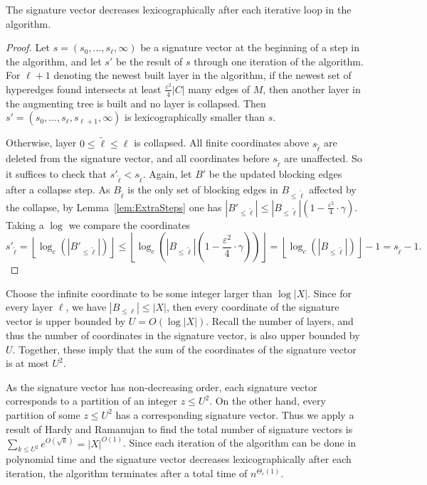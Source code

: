 \begin{lemma}\label{lem:LexOrderDecreases}
The signature vector decreases lexicographically after each iterative loop in the algorithm. 
\end{lemma}
\begin{proof}
Let $s = (s_0,\ldots,s_{\ell},\infty)$ be a signature vector at the beginning of a step in the algorithm, and let $s'$ be the result of $s$ through one iteration of the algorithm. For $\ell+1$ denoting the newest built layer in the algorithm, if the newest set of hyperedges found intersects at least $\frac{\varepsilon^2}{4}|C|$ many edges of $M$, then another layer in the augmenting tree is built and no layer is collapsed. Then $s' = (s_0,\ldots,s_{\ell},s_{\ell+1},\infty)$ is lexicographically smaller than $s$.

Otherwise, layer $0 \leq \tilde{\ell} \leq \ell$ is collapsed. All finite coordinates above $s_{\tilde{\ell}}$ are deleted from the signature vector, and all coordinates before $s_{\tilde{\ell}}$ are unaffected. So it suffices to check that $s'_{\tilde{\ell}} < s_{\tilde{\ell}}$. Again, let $B'$ be the updated blocking edges after a collapse step. As $B_{\tilde{\ell}}$ is the only set of blocking edges in $B_{\leq \tilde{\ell}}$ affected by the collapse, by Lemma~\ref{lem:ExtraSteps} one has $|B'_{\leq \tilde{\ell}}| \leq |B_{\leq \tilde{\ell}}|(1-\frac{\varepsilon^2}{4} \cdot \gamma )$. Taking a $\log$ we compare the coordinates
\[
s'_{\tilde{\ell}} = \left \lfloor \log_c \left ( \left |B'_{\leq \tilde{\ell}} \right | \right ) \right \rfloor \leq \left \lfloor \log_c \left ( \left |B_{\leq \tilde{\ell}} \right | \left (1- \frac{\varepsilon^2}{4} \cdot \gamma \right ) \right) \right \rfloor= 
\left \lfloor \log_c \left ( \left | B_{\leq \tilde{\ell}} \right | \right ) \right \rfloor -1 = s_{\tilde{\ell}}-1.
\]
\end{proof}
Choose the infinite coordinate to be some integer larger than $\log |X|$.  Since for every layer $\ell$, we have $|B_{\leq \ell}| \leq |X|$, then every coordinate of the signature vector is upper bounded by $U = O(\log |X|)$. Recall the number of layers, and thus the number of coordinates in the signature vector, is also upper bounded by $U$. Together, these imply that the sum of the coordinates of the signature vector is at most $U^2$. 

As the signature vector has non-decreasing order, each signature vector corresponds to a partition of an integer $z \leq U^2$. On the other hand, every partition of some $z \leq U^2$ has a corresponding signature vector. Thus we apply a result of Hardy and Ramanujan to find the total number of signature vectors is $\sum_{k \leq U^2} e^{O(\sqrt{k})} = |X|^{O(1)}$. Since each iteration of the algorithm can be done in polynomial time and the signature vector decreases lexicographically after each iteration, the algorithm terminates after a total time of $n^{\Theta_{\varepsilon}(1)}$. 


